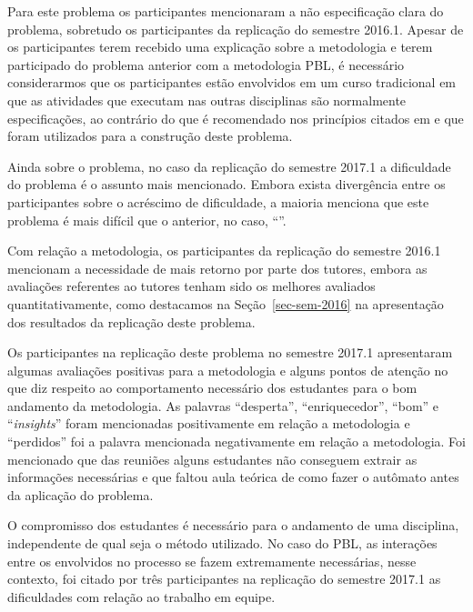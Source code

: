 Para este problema os participantes mencionaram a não especificação clara
do problema, sobretudo os participantes da replicação do semestre 2016.1.
Apesar de os participantes terem recebido
uma explicação sobre a metodologia e terem participado
do problema anterior com a metodologia PBL, é necessário considerarmos
que os participantes estão envolvidos em um curso tradicional
em que as atividades que executam nas outras disciplinas são normalmente
especificações, ao contrário do que é recomendado nos princípios citados
em \cite{dolmans1997seven} e que foram utilizados para
a construção deste problema.

Ainda sobre o problema, no caso da replicação do semestre 2017.1 a dificuldade
do problema é o assunto mais mencionado.
Embora exista divergência entre os participantes
sobre o acréscimo de dificuldade, a maioria menciona que este
problema é mais difícil que o anterior, no caso, ``\ProblemaG''.

Com relação a metodologia, os participantes da replicação do semestre 2016.1
mencionam a necessidade de mais retorno por parte dos tutores,
embora as avaliações referentes ao tutores tenham sido
os melhores avaliados quantitativamente, como destacamos
na Seção~\ref{sec-sem-2016} na apresentação dos resultados
da replicação deste problema.

Os participantes na replicação deste problema no semestre 2017.1
apresentaram algumas avaliações positivas para a metodologia
e alguns pontos de atenção no que diz respeito ao
comportamento necessário dos estudantes para o bom
andamento da metodologia.
As palavras ``desperta'', ``enriquecedor'', ``bom'' e ``\textit{insights}''
foram mencionadas positivamente em relação a metodologia e ``perdidos''
foi a palavra mencionada negativamente em relação a metodologia.
Foi mencionado que das reuniões alguns estudantes não conseguem
extrair as informações necessárias e que faltou aula teórica
de como fazer o autômato antes da aplicação do problema.

O compromisso dos estudantes é necessário para
o andamento de uma disciplina, independente de qual seja
o método utilizado.
No caso do PBL, as interações entre os envolvidos no processo
se fazem extremamente necessárias, nesse contexto,
foi citado por três participantes na replicação do semestre 2017.1 as dificuldades
com relação ao trabalho em equipe.

\subsection{\ProblemaC}

